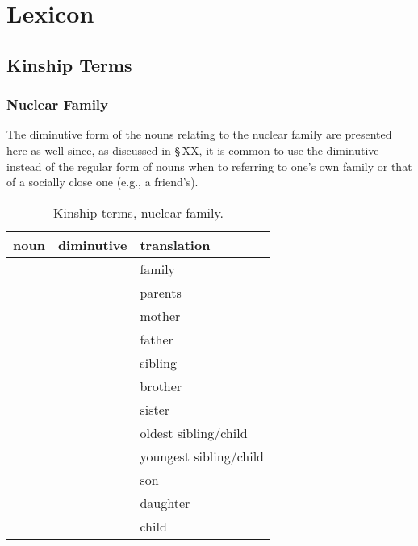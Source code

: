 \chapter{Lexicon}

\section{Kinship Terms}\label{sec:kinship terms}
\subsection{Nuclear Family}\label{sec:nuclear family}

The diminutive form of the nouns relating to the nuclear family are presented here as well since, as discussed in \S\,XX, it is common to use the diminutive instead of the regular form of nouns when to referring to one's own family or that of a socially close one (e.g., a friend's).


\begin{table}[h!]
  \caption{Kinship terms, nuclear family.}
  \label{tbl:kinship}
  \footnotesize\sffamily
  \begin{tabu} to 0.8\textwidth{YYY[1.5]}
  \toprule
  {\sc noun}    & {\sc diminutive} & {\sc translation}\\
  \midrule
      &  & family\\
      &        & parents\\
      &      & mother\\
    &      & father\\
      &      & sibling\\
      &      & brother\\
      &      & sister\\
      &      & oldest sibling/child\\
      &      & youngest sibling/child\\
      &      & son\\
      &      & daughter\\
      &      & child\\

  \bottomrule

  \end{tabu}
\end{table}



